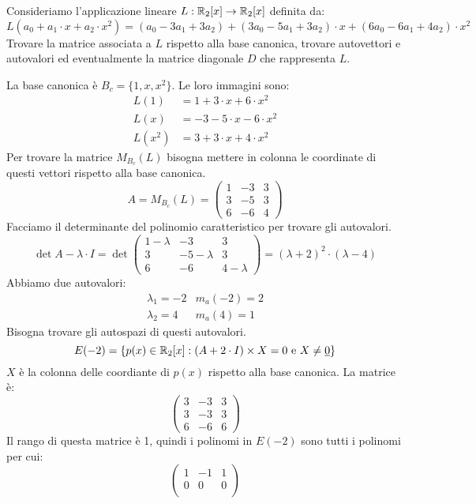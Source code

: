 \begin{exmp}
Consideriamo l'applicazione lineare $L : \mathbb{R}_2 [x] \to \mathbb{R}_2 [x]$ definita da:
\[
L(a_0 + a_1 \cdot x + a_2 \cdot x^2) =
(a_0 - 3 a_1 + 3 a_2) +
(3 a_0 - 5 a_1 + 3 a_2) \cdot x +
(6 a_0 - 6 a_1 + 4 a_2) \cdot x^2
\]
Trovare la matrice associata a $L$ rispetto alla base canonica, trovare autovettori e autovalori ed eventualmente la matrice diagonale $D$ che rappresenta $L$.

La base canonica \`e $B_c = \{ 1, x, x^2 \}$. Le loro immagini sono:
\begin{align*}
L(1) &= 1 + 3 \cdot x + 6 \cdot x^2 \\
L(x) &= -3 -5 \cdot x - 6 \cdot x^2 \\
L(x^2) &= 3 + 3 \cdot x + 4 \cdot x^2
\end{align*}
Per trovare la matrice $M_{B_c} (L)$ bisogna mettere in colonna le coordinate di questi vettori rispetto alla base canonica.
\[
A = M_{B_c} (L) =
\begin{pmatrix}
1 & -3 & 3 \\
3 & -5 & 3 \\
6 & -6 & 4
\end{pmatrix}
\]
Facciamo il determinante del polinomio caratteristico per trovare gli autovalori.
\[
\det{A - \lambda \cdot I} = 
\det{
\begin{pmatrix}
1-\lambda & -3 & 3 \\
3 & -5 - \lambda & 3 \\
6 & -6 & 4 - \lambda
\end{pmatrix}
}
=
(\lambda + 2)^2 \cdot (\lambda - 4)
\]
Abbiamo due autovalori:
\begin{align*}
\lambda_1 = -2 & m_a(-2) = 2 \\
\lambda_2 = 4 & m_a(4) = 1
\end{align*}
Bisogna trovare gli autospazi di questi autovalori.
\[
E(-2) = \left\{ p(x) \in \mathbb{R}_2 [x] : (A + 2 \cdot I) \times X = 0 \text{ e } X \neq \underline{0} \right\}
\]
$X$ \`e la colonna delle coordiante di $p(x)$ rispetto alla base canonica. La matrice \`e:
\[
\begin{pmatrix}
3 & -3 & 3 \\
3 & -3 & 3 \\
6 & -6 & 6
\end{pmatrix}
\]
Il rango di questa matrice \`e 1, quindi i polinomi in $E(-2)$ sono tutti i polinomi per cui:
\[
\begin{pmatrix}
1 & -1 & 1 \\
0 & 0 & 0 \\

\end{pmatrix}\]
\end{exmp}
